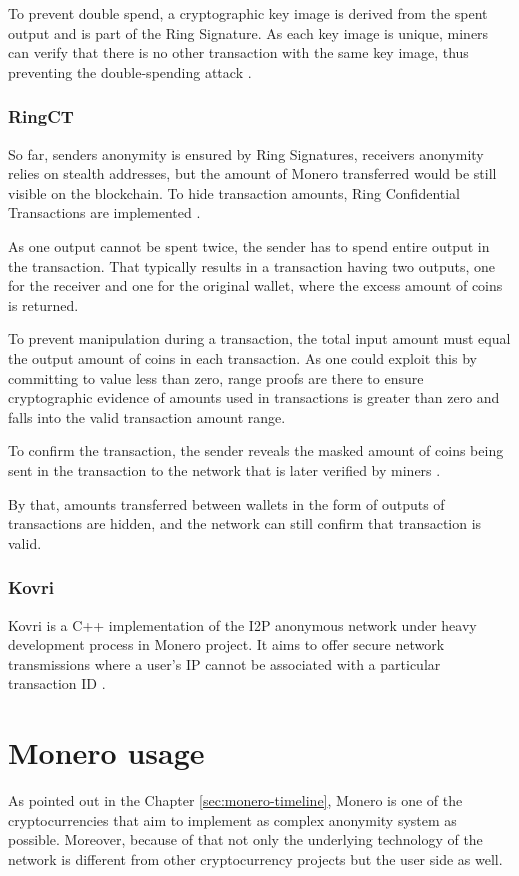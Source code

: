 \documentclass[
  printed, %
  table,   %
  lof,     %
  lot,     %
           oneside, color
]{fithesis3}
\begin{document}
To prevent double spend, a cryptographic key image is derived from the spent output and is part of the Ring Signature. As each key image is unique, miners can verify that there is no other transaction with the same key image, thus preventing the double-spending attack \cite{miller2017empirical}.

\subsection{RingCT}
\label{sec:ringct}
So far, senders anonymity is ensured by Ring Signatures, receivers anonymity relies on stealth addresses, but the amount of Monero transferred would be still visible on the blockchain. To hide transaction amounts, Ring Confidential Transactions are implemented \cite{noether2015ring}.

As one output cannot be spent twice, the sender has to spend entire output in the transaction. That typically results in a transaction having two outputs, one for the receiver and one for the original wallet, where the excess amount of coins is returned.	 

To prevent manipulation during a transaction, the total input amount must equal the output amount of coins in each transaction. As one could exploit this by committing to value less than zero, range proofs are there to ensure cryptographic evidence of amounts used in transactions is greater than zero and falls into the valid transaction amount range. 

To confirm the transaction, the sender reveals the masked amount of coins being sent in the transaction to the network that is later verified by miners \cite{sun2017ringct}. 

By that, amounts transferred between wallets in the form of outputs of transactions are hidden, and the network can still confirm that transaction is valid.

\subsection{Kovri}
Kovri is a C++ implementation of the I2P anonymous network under heavy development process in Monero project. It aims to offer secure network transmissions where a user's IP cannot be associated with a particular transaction ID \cite{monerokovri}. 

\chapter{Monero usage}
As pointed out in the Chapter \ref{sec:monero-timeline}, Monero is one of the cryptocurrencies that aim to implement as complex anonymity system as possible. Moreover, because of that not only the underlying technology of the network is different from other cryptocurrency projects but the user side as well. 
\end{document}
